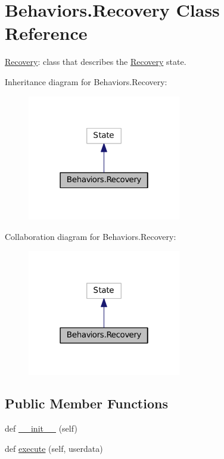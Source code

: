 \hypertarget{classBehaviors_1_1Recovery}{}\section{Behaviors.\+Recovery Class Reference}
\label{classBehaviors_1_1Recovery}


\hyperlink{classBehaviors_1_1Recovery}{Recovery}\+: class that describes the \hyperlink{classBehaviors_1_1Recovery}{Recovery} state.  




Inheritance diagram for Behaviors.\+Recovery\+:\nopagebreak
\begin{figure}[H]
\begin{center}
\leavevmode
\includegraphics[width=190pt]{classBehaviors_1_1Recovery__inherit__graph}
\end{center}
\end{figure}


Collaboration diagram for Behaviors.\+Recovery\+:\nopagebreak
\begin{figure}[H]
\begin{center}
\leavevmode
\includegraphics[width=190pt]{classBehaviors_1_1Recovery__coll__graph}
\end{center}
\end{figure}
\subsection*{Public Member Functions}
\begin{DoxyCompactItemize}
\item 
def \hyperlink{classBehaviors_1_1Recovery_a9952b507236ae466b701935a6e2482d6}{\+\_\+\+\_\+init\+\_\+\+\_\+} (self)
\item 
def \hyperlink{classBehaviors_1_1Recovery_a83ad65d2d9ca8efabb0c9977c8b8449a}{execute} (self, userdata)
\end{DoxyCompactItemize}


